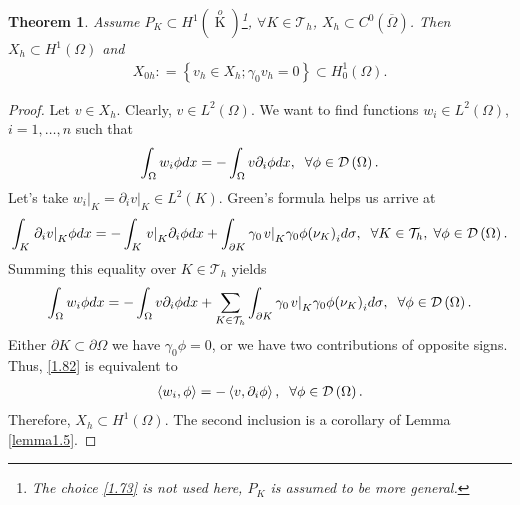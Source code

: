 \documentclass[11pt,a4paper,center,notitlepage]{article}
\numberwithin{equation}{section}
\newtheorem{theorem}{Theorem}[section]
\begin{document}
\begin{theorem}
Assume ${P_K} \subset {H^1}\left( {\mathop K\limits^o } \right)$\footnote{The choice \eqref{1.73} is not used here, $P_K$ is assumed to be more general.}, $\forall K\in \mathcal{T}_h$, $X_h \subset C^0 \left(\overline{\Omega}\right)$. Then $X_h \subset H^1\left(\Omega\right)$ and 
\begin{align}
{X_{0h}}: = \left\{ {{v_h} \in {X_h};{\gamma _0}{v_h} = 0} \right\} \subset H_0^1\left( \Omega  \right) .
\end{align}
\end{theorem}
\begin{proof}
Let $v\in X_h$. Clearly, $v\in L^2\left(\Omega\right)$. We want to find functions $w_i \in L^2\left(\Omega\right)$, $i=1,\ldots,n$ such that
\begin{align}
\int_\Omega  {{w_i}\phi dx}  =  - \int_\Omega  {v{\partial _i}\phi dx} ,\hspace{2mm} \forall \phi  \in \mathcal{D}\left( \Omega  \right).
\end{align}
Let's take ${\left. {{w_i}} \right|_K} = {\left. {{\partial _i}v} \right|_K} \in {L^2}\left( K \right)$. Green's formula helps us arrive at
\begin{align}
\int_K {{{\left. {{\partial _i}v} \right|}_K}\phi dx}  =  - \int_K {{{\left. v \right|}_K}{\partial _i}\phi dx}  + \int_{\partial K} {{\gamma _0}{{\left. v \right|}_K}{\gamma _0}\phi {{\left( {{\nu _K}} \right)}_i}d\sigma } ,\hspace{2mm}\forall K \in {\mathcal{T}_h}, \hspace{1mm} \forall \phi  \in \mathcal{D}\left( \Omega  \right).
\end{align}
Summing this equality over $K\in \mathcal{T}_h$ yields
\begin{align}
\label{1.82}
\int_\Omega  {{w_i}\phi dx}  =  - \int_\Omega  {v{\partial _i}\phi dx}  + \sum\limits_{K \in {\mathcal{T}_h}} {\int_{\partial K} {{\gamma _0}{{\left. v \right|}_K}{\gamma _0}\phi {{\left( {{\nu _K}} \right)}_i}d\sigma } } ,\hspace{2mm} \forall \phi  \in \mathcal{D}\left( \Omega  \right).
\end{align}
Either $\partial K \subset \partial \Omega$ we have $\gamma _0 \phi =0$, or we have two contributions of opposite signs. Thus, \eqref{1.82} is equivalent to
\begin{align}
\left\langle {{w_i},\phi } \right\rangle  =  - \left\langle {v,{\partial _i}\phi } \right\rangle ,\hspace{2mm}\forall \phi  \in \mathcal{D}\left( \Omega  \right).
\end{align}
Therefore, $X_h\subset H^1\left(\Omega\right)$. The second inclusion is a corollary of Lemma \ref{lemma1.5}.
\end{proof}
\end{document}
